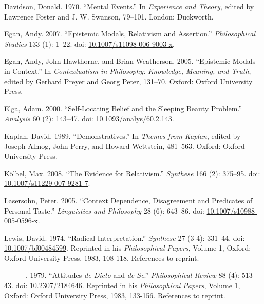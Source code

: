 \documentclass[
  11pt,
  letterpaper,
  DIV=11,
  numbers=noendperiod,
  twoside]{scrartcl}
\newlength{\cslhangindent}
\newenvironment{CSLReferences}[2] %
 {\begin{list}{}{%
  \setlength{\itemindent}{0pt}
  \setlength{\leftmargin}{0pt}
  \setlength{\parsep}{0pt}
  \ifodd #1
   \setlength{\leftmargin}{\cslhangindent}
   \setlength{\itemindent}{-1\cslhangindent}
  \fi
  \setlength{\itemsep}{#2\baselineskip}}}
 {\end{list}}
\begin{document}
\label{refs}
\begin{CSLReferences}{1}{0}
Davidson, Donald. 1970. {``Mental Events.''} In \emph{Experience and
Theory}, edited by Lawrence Foster and J. W. Swanson, 79--101. London:
Duckworth.

Egan, Andy. 2007. {``{Epistemic Modals, Relativism and Assertion}.''}
\emph{Philosophical Studies} 133 (1): 1--22. doi:
\href{https://doi.org/10.1007/s11098-006-9003-x}{10.1007/s11098-006-9003-x}.

Egan, Andy, John Hawthorne, and Brian Weatherson. 2005. {``{Epistemic
Modals in Context}.''} In \emph{Contextualism in Philosophy: Knowledge,
Meaning, and Truth}, edited by Gerhard Preyer and Georg Peter, 131--70.
Oxford: Oxford University Press.

Elga, Adam. 2000. {``Self-Locating Belief and the Sleeping Beauty
Problem.''} \emph{Analysis} 60 (2): 143--47. doi:
\href{https://doi.org/10.1093/analys/60.2.143}{10.1093/analys/60.2.143}.

Kaplan, David. 1989. {``Demonstratives.''} In \emph{Themes from Kaplan},
edited by Joseph Almog, John Perry, and Howard Wettstein, 481--563.
Oxford: Oxford University Press.

Kölbel, Max. 2008. {``The Evidence for Relativism.''} \emph{Synthese}
166 (2): 375--95. doi:
\href{https://doi.org/10.1007/s11229-007-9281-7}{10.1007/s11229-007-9281-7}.

Lasersohn, Peter. 2005. {``Context Dependence, Disagreement and
Predicates of Personal Taste.''} \emph{Linguistics and Philosophy} 28
(6): 643--86. doi:
\href{https://doi.org/10.1007/s10988-005-0596-x}{10.1007/s10988-005-0596-x}.

Lewis, David. 1974. {``Radical Interpretation.''} \emph{Synthese} 27
(3-4): 331--44. doi:
\href{https://doi.org/10.1007/bf00484599}{10.1007/bf00484599}. Reprinted
in his \emph{Philosophical Papers}, Volume 1, Oxford: Oxford University
Press, 1983, 108-118. References to reprint.

---------. 1979. {``Attitudes \emph{de Dicto} and \emph{de Se}.''}
\emph{Philosophical Review} 88 (4): 513--43. doi:
\href{https://doi.org/10.2307/2184646}{10.2307/2184646}. Reprinted in
his \emph{Philosophical Papers}, Volume 1, Oxford: Oxford University
Press, 1983, 133-156. References to reprint.


\end{CSLReferences}
\end{document}
